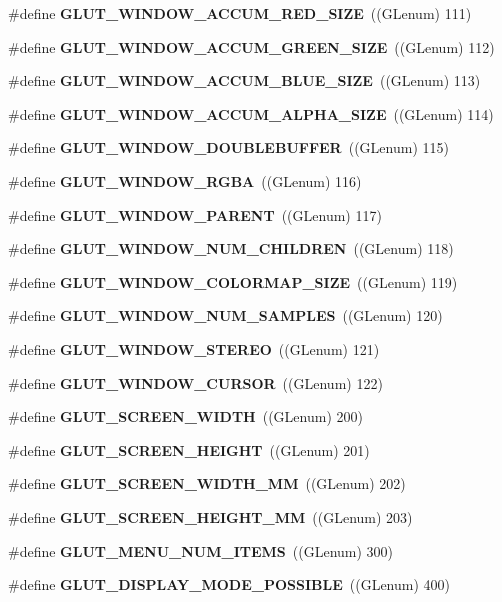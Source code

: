 \begin{DoxyCompactItemize}
\#define {\bf G\+L\+U\+T\+\_\+\+W\+I\+N\+D\+O\+W\+\_\+\+A\+C\+C\+U\+M\+\_\+\+R\+E\+D\+\_\+\+S\+I\+ZE}~((G\+Lenum) 111)
\item 
\#define {\bf G\+L\+U\+T\+\_\+\+W\+I\+N\+D\+O\+W\+\_\+\+A\+C\+C\+U\+M\+\_\+\+G\+R\+E\+E\+N\+\_\+\+S\+I\+ZE}~((G\+Lenum) 112)
\item 
\#define {\bf G\+L\+U\+T\+\_\+\+W\+I\+N\+D\+O\+W\+\_\+\+A\+C\+C\+U\+M\+\_\+\+B\+L\+U\+E\+\_\+\+S\+I\+ZE}~((G\+Lenum) 113)
\item 
\#define {\bf G\+L\+U\+T\+\_\+\+W\+I\+N\+D\+O\+W\+\_\+\+A\+C\+C\+U\+M\+\_\+\+A\+L\+P\+H\+A\+\_\+\+S\+I\+ZE}~((G\+Lenum) 114)
\item 
\#define {\bf G\+L\+U\+T\+\_\+\+W\+I\+N\+D\+O\+W\+\_\+\+D\+O\+U\+B\+L\+E\+B\+U\+F\+F\+ER}~((G\+Lenum) 115)
\item 
\#define {\bf G\+L\+U\+T\+\_\+\+W\+I\+N\+D\+O\+W\+\_\+\+R\+G\+BA}~((G\+Lenum) 116)
\item 
\#define {\bf G\+L\+U\+T\+\_\+\+W\+I\+N\+D\+O\+W\+\_\+\+P\+A\+R\+E\+NT}~((G\+Lenum) 117)
\item 
\#define {\bf G\+L\+U\+T\+\_\+\+W\+I\+N\+D\+O\+W\+\_\+\+N\+U\+M\+\_\+\+C\+H\+I\+L\+D\+R\+EN}~((G\+Lenum) 118)
\item 
\#define {\bf G\+L\+U\+T\+\_\+\+W\+I\+N\+D\+O\+W\+\_\+\+C\+O\+L\+O\+R\+M\+A\+P\+\_\+\+S\+I\+ZE}~((G\+Lenum) 119)
\item 
\#define {\bf G\+L\+U\+T\+\_\+\+W\+I\+N\+D\+O\+W\+\_\+\+N\+U\+M\+\_\+\+S\+A\+M\+P\+L\+ES}~((G\+Lenum) 120)
\item 
\#define {\bf G\+L\+U\+T\+\_\+\+W\+I\+N\+D\+O\+W\+\_\+\+S\+T\+E\+R\+EO}~((G\+Lenum) 121)
\item 
\#define {\bf G\+L\+U\+T\+\_\+\+W\+I\+N\+D\+O\+W\+\_\+\+C\+U\+R\+S\+OR}~((G\+Lenum) 122)
\item 
\#define {\bf G\+L\+U\+T\+\_\+\+S\+C\+R\+E\+E\+N\+\_\+\+W\+I\+D\+TH}~((G\+Lenum) 200)
\item 
\#define {\bf G\+L\+U\+T\+\_\+\+S\+C\+R\+E\+E\+N\+\_\+\+H\+E\+I\+G\+HT}~((G\+Lenum) 201)
\item 
\#define {\bf G\+L\+U\+T\+\_\+\+S\+C\+R\+E\+E\+N\+\_\+\+W\+I\+D\+T\+H\+\_\+\+MM}~((G\+Lenum) 202)
\item 
\#define {\bf G\+L\+U\+T\+\_\+\+S\+C\+R\+E\+E\+N\+\_\+\+H\+E\+I\+G\+H\+T\+\_\+\+MM}~((G\+Lenum) 203)
\item 
\#define {\bf G\+L\+U\+T\+\_\+\+M\+E\+N\+U\+\_\+\+N\+U\+M\+\_\+\+I\+T\+E\+MS}~((G\+Lenum) 300)
\item 
\#define {\bf G\+L\+U\+T\+\_\+\+D\+I\+S\+P\+L\+A\+Y\+\_\+\+M\+O\+D\+E\+\_\+\+P\+O\+S\+S\+I\+B\+LE}~((G\+Lenum) 400)

\end{DoxyCompactItemize}

